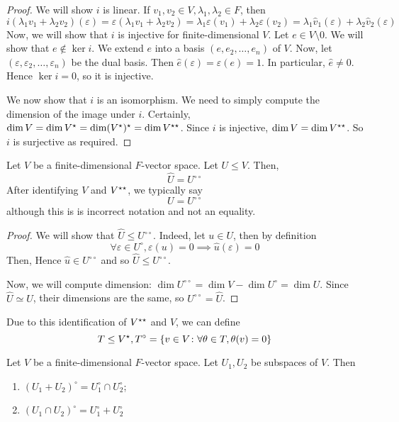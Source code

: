 \begin{proof}
	We will show \( i \) is linear.
	If \( v_1, v_2 \in V, \lambda_1, \lambda_2 \in F \), then
	\[
		i(\lambda_1 v_1 + \lambda_2 v_2) (\varepsilon) = \varepsilon(\lambda_1 v_1 + \lambda_2 v_2) = \lambda_1 \varepsilon(v_1) + \lambda_2 \varepsilon(v_2) = \lambda_1 \hat v_1(\varepsilon) + \lambda_2 \hat v_2(\varepsilon)
	\]
	Now, we will show that \( i \) is injective for finite-dimensional \( V \).
	Let \( e \in V \setminus \qty{0} \).
	We will show that \( e \not\in \ker i \).
	We extend \( e \) into a basis \( (e, e_2, \dots, e_n) \) of \( V \).
	Now, let \( (\varepsilon, \varepsilon_2, \dots, \varepsilon_n) \) be the dual basis.
	Then \( \hat e(\varepsilon) = \varepsilon(e) = 1 \).
	In particular, \( \hat e \neq 0 \).
	Hence \( \ker i = \qty{0} \), so it is injective.

	We now show that \( i \) is an isomorphism.
	We need to simply compute the dimension of the image under \( i \).
	Certainly, \( \dim V = \dim V^\star = \dim (V^\star)^\star = \dim V^{\star\star} \).
	Since \( i \) is injective, \( \dim V = \dim V^{\star\star} \).
	So \( i \) is surjective as required.
\end{proof}
\begin{lemma}
	Let \( V \) be a finite-dimensional \( F \)-vector space.
	Let \( U \leq V \).
	Then,
	\[
		\hat U = U^{\circ\circ}
	\]
	After identifying \( V \) and \( V^{\star\star} \), we typically say
	\[
		U = U^{\circ\circ}
	\]
	although this is is incorrect notation and not an equality.
\end{lemma}
\begin{proof}
	We will show that \( \hat U \leq U^{\circ\circ} \).
	Indeed, let \( u \in U \), then by definition
	\[
		\forall \varepsilon \in U^\circ, \varepsilon(u) = 0 \implies \hat u(\varepsilon) = 0
	\]
	Then,
	Hence \( \hat u \in U^{\circ\circ} \) and so \( \hat U \leq U^{\circ\circ} \).

	Now, we will compute dimension:	\( \dim U^{\circ\circ} = \dim V - \dim U^\circ = \dim U \).
	Since \( \hat U \simeq U \), their dimensions are the same, so \( U^{\circ\circ} = \hat U \).
\end{proof}
\begin{remark}
	Due to this identification of \( V^{\star\star} \) and \( V \), we can define
	\[
		T \leq V^\star, T^\circ = \qty{v \in V \colon \forall \theta \in T, \theta(v) = 0}
	\]
\end{remark}
\begin{lemma}
	Let \( V \) be a finite-dimensional \( F \)-vector space.
	Let \( U_1, U_2 \) be subspaces of \( V \).
	Then
	\begin{enumerate}
		\item \( (U_1 + U_2)^\circ = U_1^\circ \cap U_2^\circ \);
		\item \( (U_1 \cap U_2)^\circ = U_1^\circ + U_2^\circ \)
	\end{enumerate}
\end{lemma}
